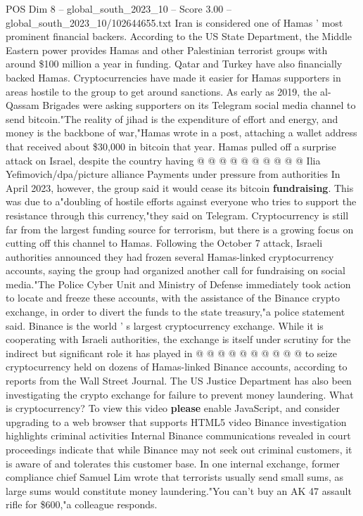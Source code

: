 \begin{textsample}{POS Dim 8 – global\_south\_2023\_10 – Score 3.00 – global\_south\_2023\_10/102644655.txt}
Iran is considered one of Hamas ' most prominent financial backers.
According to the US State Department, the Middle Eastern power provides Hamas and other Palestinian terrorist groups with around \$100 million a year in funding.
Qatar and Turkey have also financially backed Hamas.
Cryptocurrencies have made it easier for Hamas supporters in areas hostile to the group to get around sanctions.
As early as 2019, the al-Qassam Brigades were asking supporters on its Telegram social media channel to send bitcoin."The reality of jihad is the expenditure of effort and energy, and money is the backbone of war,"Hamas wrote in a post, attaching a wallet address that received about \$30,000 in bitcoin that year.
Hamas pulled off a surprise attack on Israel, despite the country having @ @ @ @ @ @ @ @ @ @ Ilia Yefimovich/dpa/picture alliance Payments under pressure from authorities In April 2023, however, the group said it would cease its bitcoin \textbf{fundraising}.
This was due to a"doubling of hostile efforts against everyone who tries to support the resistance through this currency,"they said on Telegram.
Cryptocurrency is still far from the largest funding source for terrorism, but there is a growing focus on cutting off this channel to Hamas.
Following the October 7 attack, Israeli authorities announced they had frozen several Hamas-linked cryptocurrency accounts, saying the group had organized another call for fundraising on social media."The Police Cyber Unit and Ministry of Defense immediately took action to locate and freeze these accounts, with the assistance of the Binance crypto exchange, in order to divert the funds to the state treasury,"a police statement said.
Binance is the world ' s largest cryptocurrency exchange.
While it is cooperating with Israeli authorities, the exchange is itself under scrutiny for the indirect but significant role it has played in @ @ @ @ @ @ @ @ @ @ to seize cryptocurrency held on dozens of Hamas-linked Binance accounts, according to reports from the Wall Street Journal.
The US Justice Department has also been investigating the crypto exchange for failure to prevent money laundering.
What is cryptocurrency?
To view this video \textbf{please} enable JavaScript, and consider upgrading to a web browser that supports HTML5 video Binance investigation highlights criminal activities Internal Binance communications revealed in court proceedings indicate that while Binance may not seek out criminal customers, it is aware of and tolerates this customer base.
In one internal exchange, former compliance chief Samuel Lim wrote that terrorists usually send small sums, as large sums would constitute money laundering."You can't buy an AK 47 assault rifle for \$600,"a colleague responds.

\end{textsample}
